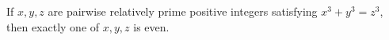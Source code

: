 If $x, y, z$ are pairwise relatively prime positive integers satisfying $x^3 + y^3 = z^3$, then exactly one of $x, y, z$ is even.
